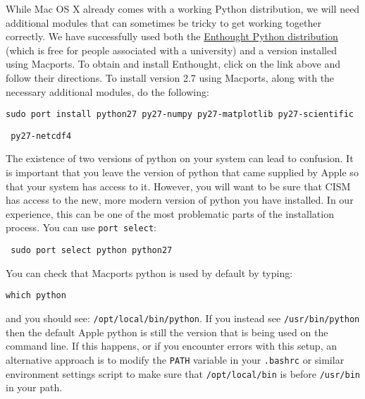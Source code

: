 \begin{mdframed}[style=mac] %
While Mac OS X already comes with a working Python distribution, we will need 
additional modules that can sometimes be tricky to get working together correctly. 
We have successfully used both the 
\href{https://www.enthought.com/products/epd/}{Enthought Python distribution} 
(which is free for people associated with a university) and a version installed 
using Macports.  To obtain and install Enthought, click on the link above and follow their directions.
To install version 2.7 using Macports, along with the necessary 
additional modules, do the following:

\texttt{sudo port install python27 py27-numpy py27-matplotlib py27-scientific}

\texttt{          py27-netcdf4}

The existence of two versions of python on your system can lead to confusion.
It is important that you leave the version of python that came supplied by Apple so that
your system has access to it.  However, you will want to be sure that CISM has access to
the new, more modern version of python you have installed.  In our experience,
this can be one of the most problematic parts of the installation process.  
You can use \texttt{port select}:

\texttt{ sudo port select python python27}

\noindent
You can check that Macports python is used by default by typing:

\texttt{which python}

\noindent
and you should see: \texttt{/opt/local/bin/python}.  
If you instead see \texttt{/usr/bin/python} then the default Apple python is still 
the version that is being used on the command line.  If this happens, or if you 
encounter errors with this setup, an alternative approach is to modify the 
\texttt{PATH} variable in your \texttt{.bashrc} or similar environment settings script
to make sure that \texttt{/opt/local/bin} is before \texttt{/usr/bin} in your path.
\end{mdframed}              %



